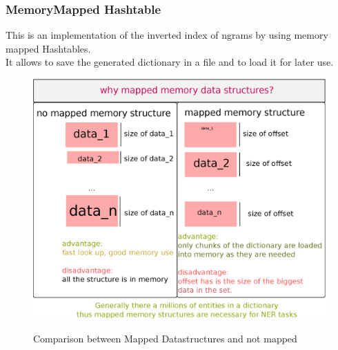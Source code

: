 \subsubsection{MemoryMapped Hashtable}
 This is an implementation of the inverted index of ngrams by using memory mapped Hashtables.\\
It allows to save the generated dictionary in a file and to load it for later use.

\begin{figure}[h!]
  \caption{Comparison between Mapped Datastructures and not mapped}
  \centering
    \includegraphics[scale=0.5]{graphics/memoryMappedVsNonMemoryMapped}
   \label{fig:mappedDataStructures}  
\end{figure}


  
